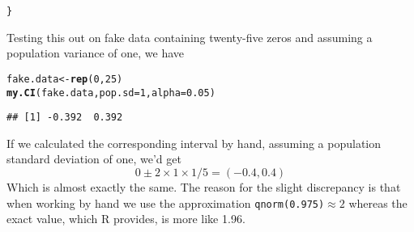 \documentclass[addpoints,12pt]{exam}\usepackage[]{graphicx}\usepackage[]{color}
\makeatletter
\newcommand{\hlnum}[1]{\textcolor[rgb]{0.686,0.059,0.569}{#1}}%
\newcommand{\hlstd}[1]{\textcolor[rgb]{0.345,0.345,0.345}{#1}}%
\newcommand{\hlkwb}[1]{\textcolor[rgb]{0.69,0.353,0.396}{#1}}%
\newcommand{\hlkwc}[1]{\textcolor[rgb]{0.333,0.667,0.333}{#1}}%
\newcommand{\hlkwd}[1]{\textcolor[rgb]{0.737,0.353,0.396}{\textbf{#1}}}%
\newenvironment{kframe}{%
 \def\at@end@of@kframe{}%
 \ifinner\ifhmode%
  \def\at@end@of@kframe{\end{minipage}}%
  \begin{minipage}{\columnwidth}%
 \fi\fi%
 \def\FrameCommand##1{\hskip\@totalleftmargin \hskip-\fboxsep
 \colorbox{shadecolor}{##1}\hskip-\fboxsep
     \hskip-\linewidth \hskip-\@totalleftmargin \hskip\columnwidth}%
 \MakeFramed {\advance\hsize-\width
   \@totalleftmargin\z@ \linewidth\hsize
   \@setminipage}}%
 {\par\unskip\endMakeFramed%
 \at@end@of@kframe}
\newenvironment{knitrout}{}{} %
\makeatother
\begin{document}
\begin{questions}
\begin{parts}
\begin{solution}
\begin{knitrout}
\begin{kframe}
\begin{alltt}
\hlstd{\}}
\end{alltt}
\end{kframe}
\end{knitrout}
Testing this out on fake data containing twenty-five zeros and assuming a population variance of one, we have
\begin{knitrout}
\color{fgcolor}\begin{kframe}
\begin{alltt}
\hlstd{fake.data} \hlkwb{<-} \hlkwd{rep}\hlstd{(}\hlnum{0}\hlstd{,} \hlnum{25}\hlstd{)}
\hlkwd{my.CI}\hlstd{(fake.data,} \hlkwc{pop.sd} \hlstd{=} \hlnum{1}\hlstd{,} \hlkwc{alpha} \hlstd{=} \hlnum{0.05}\hlstd{)}
\end{alltt}
\begin{verbatim}
## [1] -0.392  0.392
\end{verbatim}
\end{kframe}
\end{knitrout}
If we calculated the corresponding interval by hand, assuming a population standard deviation of one, we'd get
  $$0 \pm  2 \times 1 \times 1/5 = (-0.4, 0.4)$$
Which is almost exactly the same. The reason for the slight discrepancy is that when working by hand we use the approximation \texttt{qnorm(0.975)}$\approx 2$ whereas the exact value, which R provides, is more like 1.96.
\end{solution}

\end{parts}
\end{questions}
\end{document}
